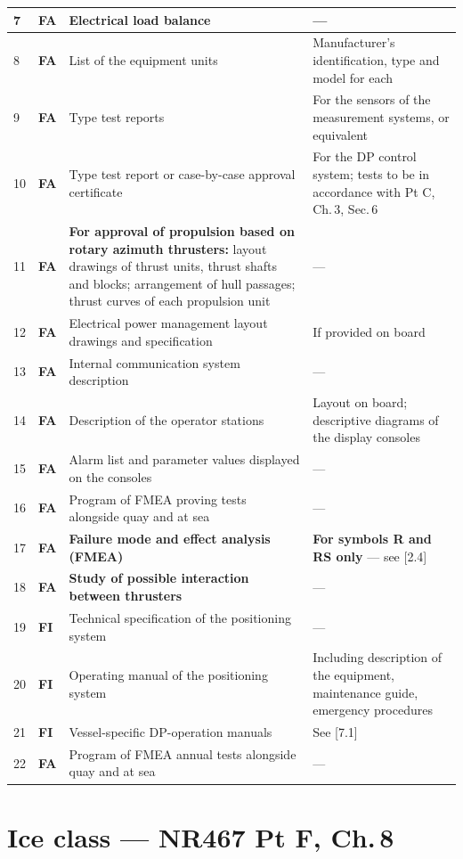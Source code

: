 \documentclass[11pt,a4paper]{report}
\newcommand{\fa}{\textbf{\textcolor{warningred}{FA}}}
\newcommand{\fic}{\textbf{\textcolor{bvgray}{FI}}}
\begin{document}
\begin{longtable}{|p{0.7cm}|p{1.1cm}|p{5.8cm}|p{6.4cm}|}
7 & \fa{} & Electrical load balance & --- \\
\hline
8 & \fa{} & List of the equipment units & Manufacturer's identification, type and model for each \\
\hline
9 & \fa{} & Type test reports & For the sensors of the measurement systems, or equivalent \\
\hline
10 & \fa{} & Type test report or case-by-case approval certificate & For the DP control system; tests to be in accordance with Pt C, Ch.\,3, Sec.\,6 \\
\hline
11 & \fa{} & \textbf{For approval of propulsion based on rotary azimuth thrusters:} layout drawings of thrust units, thrust shafts and blocks; arrangement of hull passages; thrust curves of each propulsion unit & --- \\
\hline
12 & \fa{} & Electrical power management layout drawings and specification & If provided on board \\
\hline
13 & \fa{} & Internal communication system description & --- \\
\hline
14 & \fa{} & Description of the operator stations & Layout on board; descriptive diagrams of the display consoles \\
\hline
15 & \fa{} & Alarm list and parameter values displayed on the consoles & --- \\
\hline
16 & \fa{} & Program of FMEA proving tests alongside quay and at sea & --- \\
\hline
17 & \fa{} & \textbf{Failure mode and effect analysis (FMEA)} & \textbf{For symbols R and RS only} --- see [2.4] \\
\hline
18 & \fa{} & \textbf{Study of possible interaction between thrusters} & --- \\
\hline
19 & \fic{} & Technical specification of the positioning system & --- \\
\hline
20 & \fic{} & Operating manual of the positioning system & Including description of the equipment, maintenance guide, emergency procedures \\
\hline
21 & \fic{} & Vessel-specific DP-operation manuals & See [7.1] \\
\hline
22 & \fa{} & Program of FMEA annual tests alongside quay and at sea & --- \\
\hline
\end{longtable}

\newpage

\section{Ice class --- NR467 Pt F, Ch.\,8}
\label{sec:iceruletable}
\end{document}
